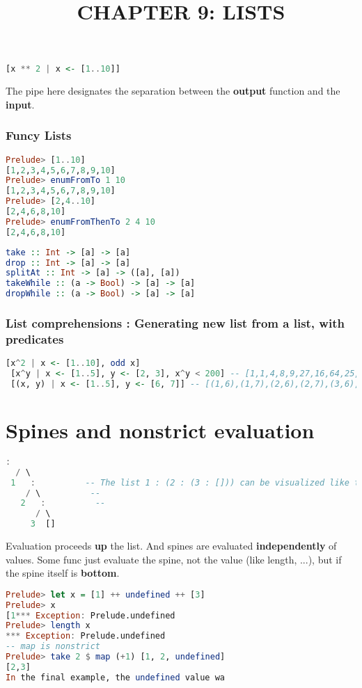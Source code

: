 \documentclass{article}
\title{CHAPTER 9: LISTS}
\date{}
\author{}
\begin{document}
\begin{lstlisting}[language = Haskell]
 [x ** 2 | x <- [1..10]]  
\end{lstlisting}
   The pipe here designates the separation between  the \textbf{\textcolor{BlueGreen}{output}} function
   and the \textcolor{VioletRed}{\textbf{input}}.
\subsubsection*{Funcy Lists}
\begin{minipage}[t]{0.45\linewidth}
\begin{lstlisting}[language = Haskell]
 Prelude> [1..10]
[1,2,3,4,5,6,7,8,9,10]
Prelude> enumFromTo 1 10
[1,2,3,4,5,6,7,8,9,10]
Prelude> [2,4..10]
[2,4,6,8,10]
Prelude> enumFromThenTo 2 4 10
[2,4,6,8,10]
\end{lstlisting}
\end{minipage}\hfill
  \begin{minipage}[t]{0.45\linewidth}
\begin{lstlisting}[language = Haskell]
take :: Int -> [a] -> [a]
drop :: Int -> [a] -> [a]
splitAt :: Int -> [a] -> ([a], [a])
takeWhile :: (a -> Bool) -> [a] -> [a]
dropWhile :: (a -> Bool) -> [a] -> [a]
\end{lstlisting}
\end{minipage}

\subsubsection*{List comprehensions : Generating new list from a list, with predicates}

\begin{lstlisting}[language = Haskell]
 [x^2 | x <- [1..10], odd x] 
 [x^y | x <- [1..5], y <- [2, 3], x^y < 200] -- [1,1,4,8,9,27,16,64,25,125]
 [(x, y) | x <- [1..5], y <- [6, 7]] -- [(1,6),(1,7),(2,6),(2,7),(3,6),(3,7)]
\end{lstlisting}

\section{Spines and nonstrict evaluation}
\begin{lstlisting}[language = Haskell]
   :                     
  / \  
 1   :          -- The list 1 : (2 : (3 : [])) can be visualized like this
    / \          -- 
   2   :          --
      / \
     3  []
\end{lstlisting}        
Evaluation proceeds \textbf{up} the list. And spines are evaluated \textbf{independently} of values. Some {\selectfont func} just evaluate the spine, not the value (like {\selectfont length, ...}), but if the spine itself is \textbf{bottom}.
\begin{lstlisting}[language = Haskell]
Prelude> let x = [1] ++ undefined ++ [3]
Prelude> x
[1*** Exception: Prelude.undefined
Prelude> length x
*** Exception: Prelude.undefined
-- map is nonstrict
Prelude> take 2 $ map (+1) [1, 2, undefined]
[2,3]
In the final example, the undefined value wa
\end{lstlisting}
\end{document}
